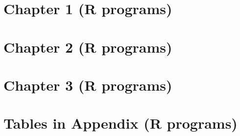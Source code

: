 \documentclass[10pt,a4paper]{article}
\begin{document}
\section{Chapter 1 (R programs)}







\clearpage
\section{Chapter 2 (R programs)}








\clearpage
\section{Chapter 3 (R programs)}





%








\clearpage
\section*{Tables in Appendix (R programs)}


\end{document}
